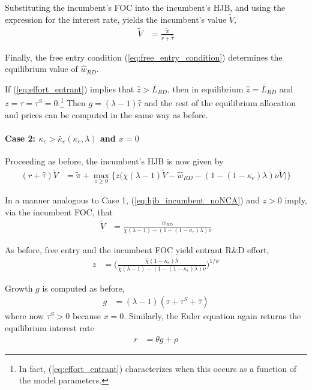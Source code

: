\documentclass[11pt,english]{article}
\theoremstyle{remark}
\begin{document}
Substituting the incumbent's FOC into the incumbent's HJB, and using the expression for the interest rate, yields the incumbent's value $\tilde{V}$,
\begin{align}
	 \tilde{V} &= \frac{\tilde{\pi}}{r + \hat{\tau}}
\end{align}

Finally, the free entry condition (\ref{eq:free_entry_condition}) determines the equilibrium value of $\hat{w}_{RD}$.

If (\ref{eq:effort_entrant}) implies that $\hat{z} > \bar{L}_{RD}$, then in equilibrium $\hat{z} = \bar{L}_{RD}$ and $z = \tau = \tau^S = 0$.\footnote{In fact, (\ref{eq:effort_entrant}) characterizes when this occurs as a function of the model parameters.} Then $g = (\lambda - 1) \hat{\tau}$ and the rest of the equilibrium allocation and prices can be computed in the same way as before. 

\paragraph{Case 2: $\kappa_c > \bar{\kappa}_c(\kappa_e,\lambda)$ and $x = 0$}
Proceeding as before, the incumbent's HJB is now given by 
\begin{align}
	(r + \hat{\tau}) \tilde{V} &= \tilde{\pi} + \max_{z \ge 0 } \Big\{ z \Big( \chi (\lambda - 1) \tilde{V} - \hat{w}_{RD} - (1 - (1-\kappa_e)\lambda) \nu \tilde{V} \Big)  \Big\}\label{eq:hjb_incumbent_noNCA}
\end{align}

In a manner analogous to Case 1, (\ref{eq:hjb_incumbent_noNCA}) and $z > 0$ imply, via the incumbent FOC, that
\begin{align}
\tilde{V} &= \frac{\hat{w}_{RD}}{\chi(\lambda - 1) - (1-(1-\kappa_{e})\lambda)\nu} \label{eq:hjb_incumbent_foc_noNCA}
\end{align}

As before, free entry and the incumbent FOC yield entrant R\&D effort, 
\begin{align}
	\hat{z} &= \Big( \frac{\hat{\chi} (1-\kappa_{e}) \lambda}{\chi(\lambda-1) - (1-(1-\kappa_e)\lambda)\nu } \Big)^{1/\psi} \label{eq:effort_entrant_case2}
\end{align}

Growth $g$ is computed as before,
\begin{align}
g &= (\lambda - 1)(\tau + \tau^S + \hat{\tau}) \label{eq:growth_accounting_noNCA}
\end{align}
where now $\tau^S > 0$ because $x = 0$. Similarly, the Euler equation again returns the equilibrium interest rate 
\begin{align*}
	r &= \theta g + \rho
\end{align*}
\end{document}

